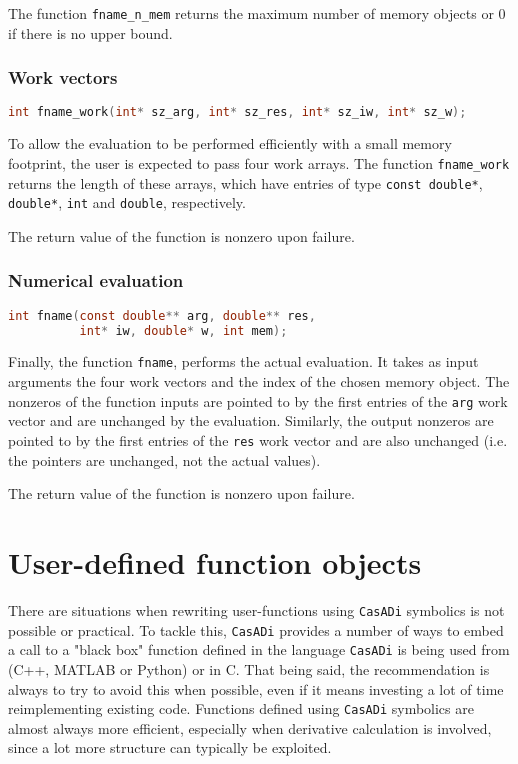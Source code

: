 \documentclass[a4paper,12pt]{book}
\newcommand{\CasADi}{\texttt{CasADi}\xspace}
\begin{document}
The function \verb|fname_n_mem| returns the maximum number of memory objects
or 0 if there is no upper bound.

\subsection*{Work vectors}
\begin{lstlisting}[language=C]
int fname_work(int* sz_arg, int* sz_res, int* sz_iw, int* sz_w);
\end{lstlisting}

To allow the evaluation to be performed efficiently with a small memory
footprint, the user is expected to pass four work arrays. The function
\verb|fname_work| returns the length of these arrays, which have entries
of type \verb|const double*|, \verb|double*|, \verb|int| and \verb|double|,
respectively.

The return value of the function is nonzero upon failure.

\subsection*{Numerical evaluation}
\begin{lstlisting}[language=C]
int fname(const double** arg, double** res,
          int* iw, double* w, int mem);
\end{lstlisting}

Finally, the function \verb|fname|, performs the actual evaluation. It takes
as input arguments the four work vectors and the index of the chosen memory
object. The nonzeros of the function inputs are pointed to by the
first entries of the \texttt{arg} work vector and are unchanged by the evaluation.
Similarly, the output nonzeros are pointed to by the first entries of the
\texttt{res} work vector and are also unchanged (i.e. the pointers are unchanged,
not the actual values).

The return value of the function is nonzero upon failure.


\chapter{User-defined function objects} \label{ch:user-defined}
There are situations when rewriting user-functions using \CasADi symbolics is not
possible or practical. To tackle this, \CasADi provides a number of ways to
embed a call to a "black box" function defined in the language \CasADi is being
used from (C++, MATLAB or Python) or in C.
That being said, the recommendation is always to try to avoid this when possible,
even if it means investing a lot of time reimplementing existing code.
Functions defined using \CasADi symbolics are almost always more
efficient, especially when derivative calculation is involved, since a lot more
structure can typically be exploited.
\end{document}
